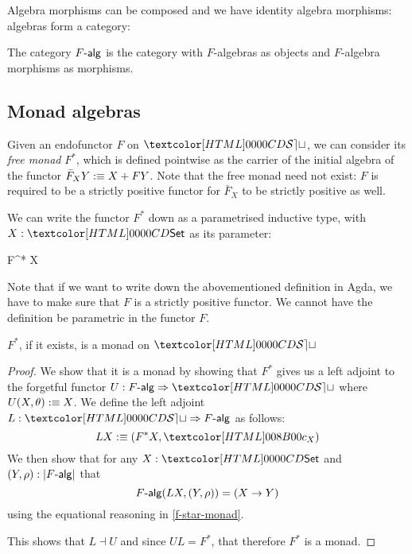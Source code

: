 Algebra morphisms can be composed and we have identity algebra
morphisms: algebras form a category:

\begin{definition}
  The category $\algcat{F}$ is the category with $F$-algebras as
  objects and $F$-algebra morphisms as morphisms.
\end{definition}

\subsection{Monad algebras}

Given an endofunctor $F$ on $\SET$, we can consider its \emph{free
  monad} $F^*$, which is defined pointwise as the carrier of the
initial algebra of the functor $\bar{F}_X Y :\equiv X + FY$. Note that
the free monad need not exist: $F$ is required to be a strictly
positive functor for $\bar{F}_X$ to be strictly positive as well.

We can write the functor $F^*$ down as a parametrised inductive type,
with $X : \Set$ as its parameter:
%
\begin{datatype}{F^* X}{\Set}
   \\
\end{datatype}
%
Note that if we want to write down the abovementioned definition in
Agda, we have to make sure that $F$ is a strictly positive functor. We
cannot have the definition be parametric in the functor $F$.

\begin{proposition}
  \label{free-monad-thm}
  $F^*$, if it exists, is a monad on $\SET$
\end{proposition}

\begin{proof}
  We show that it is a monad by showing that $F^*$ gives us a left
  adjoint to the forgetful functor $U : \Func{\algcat{F}}{\SET}$ where
  $U (X , \theta) :\equiv X$. We define the left adjoint
  $L : \Func{\SET}{\algcat{F}}$ as follows:
  $$
  L X \ddefeq (F^* X , \Fstarc_X)
  $$
  We then show that for any $X : \Set$ and $(Y,\rho) : | \algcat{F} |$ that
  $$
  \algcat{F}(L X , (Y,\rho)) = (X \to Y)
  $$
  using the equational reasoning in \cref{f-star-monad}.

  This shows that $L \dashv U$ and since $UL = F^*$, that therefore
  $F^*$ is a monad.
\end{proof}


